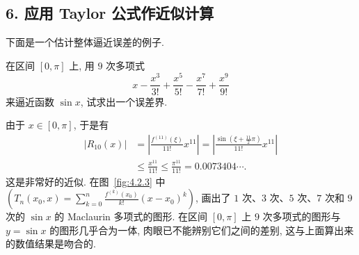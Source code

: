 \subsection*{6. 应用 Taylor 公式作近似计算}

下面是一个估计整体逼近误差的例子.

\begin{example}\label{ex:4.2.11}
在区间 $[0,\pi]$ 上, 用 $9$ 次多项式
\[
x-\frac{x^{3}}{3!}+\frac{x^{5}}{5!}-\frac{x^{7}}{7!}+\frac{x^{9}}{9!}
\]
来逼近函数 $\sin x$, 试求出一个误差界.
\end{example}

\begin{solution}
由于 $x \in [0, \pi]$, 于是有
\begin{align*}
|R_{10}(x)|
&=\left|\frac{f^{(11)}(\xi)}{11!}x^{11}\right|=\left|\frac{\sin\left(\xi+\frac{11}{2}\pi\right)}{11!}x^{11}\right| \\
&\leqslant\frac{x^{11}}{11!}\leqslant\frac{\pi^{11}}{11!}=0.0073404\cdots.
\end{align*}
这是非常好的近似. 在图~\ref{fig:4.2.3} 中 $\left(T_{n}(x_{0}, x)=\sum_{k=0}^{n}\frac{f^{(k)}(x_{0})}{k!}(x-x_{0})^{k}\right)$, 画出了 $1$ 次、$3$ 次、$5$ 次、$7$ 次和 $9$ 次的 $\sin x$ 的 Maclaurin 多项式的图形. 在区间 $[0,\pi]$ 上 $9$ 次多项式的图形与 $y = \sin x$ 的图形几乎合为一体, 肉眼已不能辨别它们之间的差别, 这与上面算出来的数值结果是吻合的.
\end{solution}

